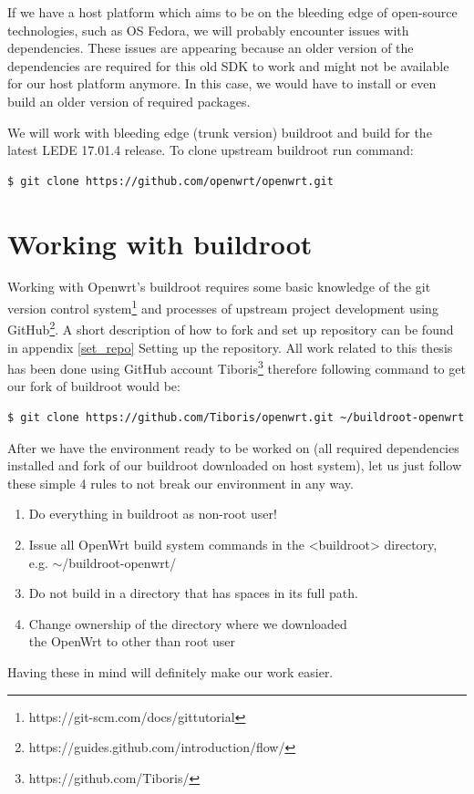 If we have a host platform which aims to be on the bleeding edge of open-source technologies, such as OS Fedora, we will probably encounter issues with dependencies.
These issues are appearing because an older version of the dependencies are required for this old SDK to work and might not be available for our host platform anymore.
In this case, we would have to install or even build an older version of required packages.

We will work with bleeding edge (trunk version) buildroot and build for the latest LEDE 17.01.4 release.
To clone upstream buildroot run command:
\begin{lstlisting}[columns=fixed,basicstyle=\ttfamily\footnotesize,tabsize=4,backgroundcolor=\color{yellow!10}]
$ git clone https://github.com/openwrt/openwrt.git
\end{lstlisting}

\section{Working with buildroot}\label{working-with-buildroot}

Working with Openwrt's buildroot requires some basic knowledge of the git version control system\footnote{https://git-scm.com/docs/gittutorial} and processes of upstream project development using GitHub\footnote{https://guides.github.com/introduction/flow/}.
A short description of how to fork and set up repository can be found in appendix \ref{set_repo} Setting up the repository. %
All work related to this thesis has been done using GitHub account Tiboris\footnote{https://github.com/Tiboris/} therefore following command to get our fork of buildroot would be:
\begin{lstlisting}[columns=fixed,basicstyle=\ttfamily\footnotesize,tabsize=4,backgroundcolor=\color{yellow!10}]
$ git clone https://github.com/Tiboris/openwrt.git ~/buildroot-openwrt
\end{lstlisting}

After we have the environment ready to be worked on (all required dependencies installed and fork of our buildroot downloaded on host system), let us just follow these simple 4 rules to not break our environment in any way.
\begin{enumerate}
    \item Do everything in buildroot as non-root user!
    \item Issue all OpenWrt build system commands in the <buildroot> directory, \\e.g. $\sim$/buildroot-openwrt/
    \item Do not build in a directory that has spaces in its full path.
    \item Change ownership of the directory where we downloaded \\the OpenWrt to other than root user
\end{enumerate}
Having these in mind will definitely make our work easier.




